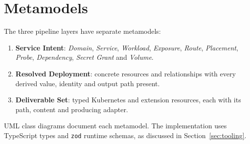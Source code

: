 \section{Metamodels}

The three pipeline layers have separate metamodels:

\begin{enumerate}
  \item \textbf{Service Intent}: \emph{Domain}, \emph{Service},
    \emph{Workload}, \emph{Exposure}, \emph{Route}, \emph{Placement},
    \emph{Probe}, \emph{Dependency}, \emph{Secret Grant} and \emph{Volume}.
  \item \textbf{Resolved Deployment}: concrete resources and relationships with
    every derived value, identity and output path present.
  \item \textbf{Deliverable Set}: typed Kubernetes and extension resources,
    each with its path, content and producing adapter.
\end{enumerate}

UML class diagrams document each metamodel. The implementation uses TypeScript
types and \texttt{zod} runtime schemas, as discussed in
Section~\ref{sec:tooling}.
